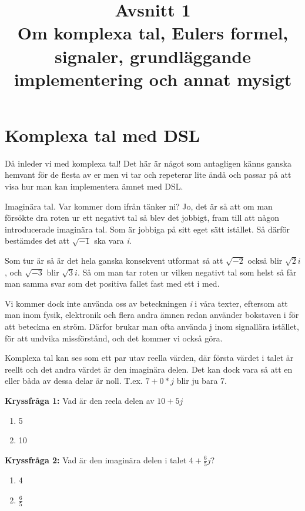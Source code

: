 \documentclass{article}
\title{Avsnitt 1 \\
\large Om komplexa tal, Eulers formel, signaler, grundläggande implementering och annat mysigt}
\author{ }
\date{}
\begin{document}
\maketitle

\section{Komplexa tal med DSL}
Då inleder vi med komplexa tal! Det här är något som antagligen känns ganska
hemvant för de flesta av er men vi tar och repeterar lite ändå och passar på
att visa hur man kan implementera ämnet med DSL.

Imaginära tal. Var kommer dom ifrån tänker ni? Jo, det är så att om man
försökte dra roten ur ett negativt tal så blev det jobbigt, fram till att
någon introducerade imaginära tal. Som är jobbiga på sitt eget sätt istället.
Så därför bestämdes det att $\sqrt{-1}$ ska vara \emph{i}.

Som tur är så är det hela ganska konsekvent utformat så att $\sqrt{-2}$ också
blir $\sqrt{2}i$, och $\sqrt{-3}$ blir $\sqrt{3} i$. Så om man tar roten ur
vilken negativt tal som helst så får man samma svar som det positiva fallet
fast med ett i med.

Vi kommer dock inte använda oss av beteckningen \emph{i} i våra texter, eftersom
att man inom fysik, elektronik och flera andra ämnen redan använder bokstaven i
för att beteckna en ström. Därfor brukar man ofta använda j inom signallära
istället, för att undvika missförstånd, och det kommer vi också göra.

Komplexa tal kan ses som ett par utav reella värden, där första
värdet i talet är reellt och det andra värdet är den imaginära
delen. Det kan dock vara så att en eller båda av dessa delar är noll.
T.ex. $7+0*j$ blir ju bara 7.


\textbf{Kryssfråga 1:} Vad är den reela delen av $10 + 5 j$
\begin{enumerate}[label={\alph*)},font={\bfseries}]
\item 5
\item 10
\end{enumerate}
\textbf{Kryssfråga 2:} Vad är den imaginära delen i talet $4 + \frac{6}{5}j$?
\begin{enumerate}[label={\alph*)},font={\bfseries}]
\item 4
\item $\frac{6}{5}$
\end{enumerate}
\end{document}
